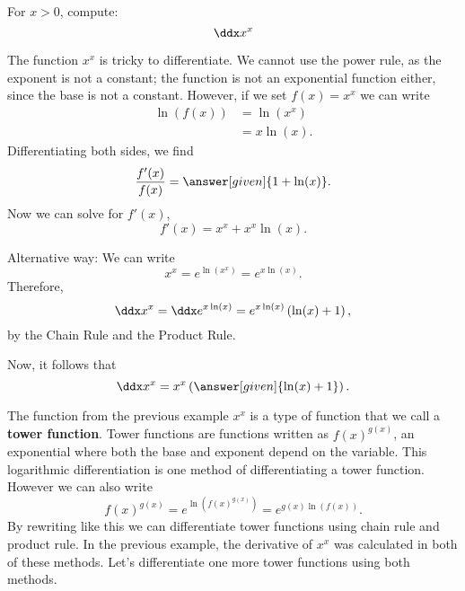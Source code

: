 \documentclass{ximera}
\begin{document}
\begin{example}
	For  $x>0$, compute: 
	\[ \ddx x^x \]
	\begin{explanation}
		The function $x^x$ is tricky to differentiate. We cannot use the power
		rule, as the exponent is not a constant; the function is not an exponential function either, since the base is not a constant. However, if we set $f(x) =
		x^x$ we can write
		\begin{align*}
			\ln(f(x)) &= \ln\left(x^x\right)\\
				&=x\ln(x).
		\end{align*}
		Differentiating both sides, we find
		\[ \frac{f'(x)}{f(x)} = \answer[given]{1 + \ln(x)}. \]
		Now we can solve for $f'(x)$, 
		\[ f'(x) = x^x + x^x\ln(x). \]
		
		Alternative way: We can write 
		\[ x^x= e^{\ln(x^x)}=e^{x\ln(x)}. \]
		Therefore,
		\[ \ddx x^x=\ddx e^{x\ln(x)}=e^{x\ln(x)}\left(\ln(x)+1\right), \]
		by the Chain Rule and the Product Rule.
		
		Now, it follows  that
		\[ \ddx x^x=x^x\left(\answer[given]{\ln(x)+1}\right). \]
	\end{explanation}
\end{example}

The function from the previous example $x^x$ is a type of function that we call a \textbf{tower function}. Tower functions are functions written as $f(x)^{g(x)}$, an exponential where both the base and exponent depend on the variable.
This logarithmic differentiation is one method of differentiating a tower function. However we can also write 
\[ f(x)^{g(x)} = e^{\ln\left( f(x)^{g(x)} \right)} = e^{g(x)\ln( f(x) ) }. \]
By rewriting like this we can differentiate tower functions using chain rule and product rule. In the previous example, the derivative of $x^x$ was calculated in both of these methods. 
Let's differentiate one more tower functions using both methods.
\end{document}
